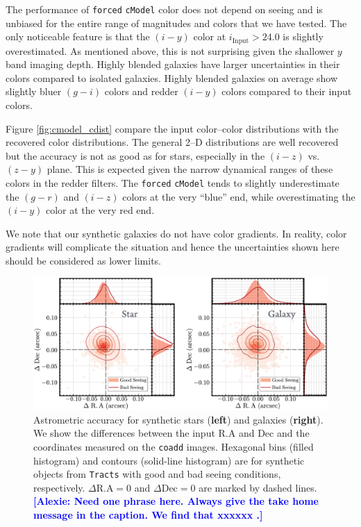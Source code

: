 \documentclass[useamsfonts]{pasj01}
\newcommand{\alexie}[1]{\textcolor{blue}{\textbf{[Alexie: #1]}}}
\def\cmodel{\texttt{cModel}}
\def\forced{\texttt{forced}}
\def\coadd{\texttt{coadd}}
\def\tracts{\texttt{Tracts}}
\begin{document}
    The performance of \forced{} \cmodel{} color does not depend on seeing and is 
    unbiased for the entire range of magnitudes and colors that we have tested.
    The only noticeable feature is that the $(i-y)$ color at $i_{\mathrm{Input}}>24.0$ 
    is slightly overestimated.
    As mentioned above, this is not surprising given the shallower $y$ band imaging depth. Highly blended galaxies have larger uncertainties in their colors compared to isolated galaxies.  Highly blended galaxies on average show slightly bluer $(g-i)$ colors and redder  
    $(i-y)$ colors compared to their input colors.

Figure  \ref{fig:cmodel_cdist} compare the input color--color distributions with the recovered color distributions. The general 2--D distributions are well recovered but the accuracy is not as good as for stars, especially in the $(i-z)$ vs. $(z-y)$ plane.
    This is expected given the narrow dynamical ranges of these colors in the redder filters.
    The \forced{} \cmodel{} tends to slightly underestimate the $(g-r)$ and $(i-z)$
    colors at the very ``blue'' end, while overestimating the $(i-y)$ color at the very
    red end.

We note that  our synthetic galaxies do not have color gradients.  In reality, color gradients will complicate the situation and hence the uncertainties shown here should be considered as lower limits.
    


\begin{figure}
    \begin{center}
        \includegraphics[width=\textwidth]{fig/synpipe_astrometry}
    \end{center}
    \caption{
        Astrometric accuracy for synthetic stars (\textbf{left}) and galaxies
        (\textbf{right}). We show the differences between the input R.A and Dec and the coordinates measured on the \coadd{} images. Hexagonal bins (filled histogram) and contours (solid-line histogram) are for synthetic objects from \tracts{} with good and bad seeing conditions, 
        respectively.
        $\Delta\mathrm{R.A}=0$ and $\Delta\mathrm{Dec}=0$ are marked by dashed lines. \alexie{Need one phrase here. Always give the take home message in the caption. We find that xxxxxx .}
        }
    \label{fig:astrometry}
\end{figure}
\end{document}
